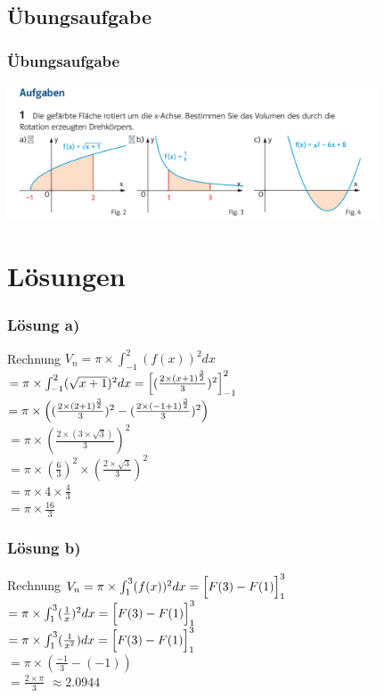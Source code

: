 \documentclass{beamer}
\begin{document}
	\begin{frame}
		\section{Übungsaufgabe}
		\frametitle{Übungsaufgabe}
		\includegraphics[width=11cm]{IMG_58408E42A4CB-1.JPEG}
	\end{frame}
	
	\section{Lösungen}
	\begin{frame}
		\frametitle{Lösung a)}
		\begin{block}{Rechnung}
			$V_n = \pi \times \int_{-1}^{2} (f(x))^2 dx$ \\
			$= \pi \times \int_{-1}^{2} (\sqrt{x+1})^2 dx = \Bigl[(\frac{2 \times (x+1)^{\frac{3}{2}}}{3})^2\Bigl]_{-1}^{2}$ \\
			$= \pi \times \Bigl((\frac{2 \times (2+1)^{\frac{3}{2}}}{3})^2 - (\frac{2 \times (-1+1)^{\frac{3}{2}}}{3})^2\Bigl)$ \\
			$= \pi \times (\frac{2 \times (3 \times \sqrt{3})}{3})^2$ \\
			$= \pi \times (\frac{6}{3})^2 \times (\frac{2 \times \sqrt{3}}{3})^2$ \\
			$= \pi \times 4 \times \frac{4}{3}$ \\
			$= \pi \times \frac{16}{3}$
		\end{block}
	\end{frame}
	
	\begin{frame}
		\frametitle{Lösung b)}

		\begin{block}{Rechnung}	
			$V_n = \pi \times \int_{1}^{3}(f(x))^2 dx = \Bigl[F(3) - F(1)\Bigl]_{1}^{3}$ \\
			$= \pi \times \int_{1}^{3}(\frac{1}{x})^2 dx = \Bigl[F(3) - F(1)\Bigl]_{1}^{3}$ \\
			$= \pi \times \int_{1}^{3}(\frac{1}{x^2}) dx = \Bigl[F(3) - F(1)\Bigl]_{1}^{3}$ \\
			$= \pi \times (\frac{-1}{3}-(-1))$ \\
			$= \frac{2 \times \pi}{3}$ $\approx 2.0944$
		\end{block}

	\end{frame}
	
\end{document}
